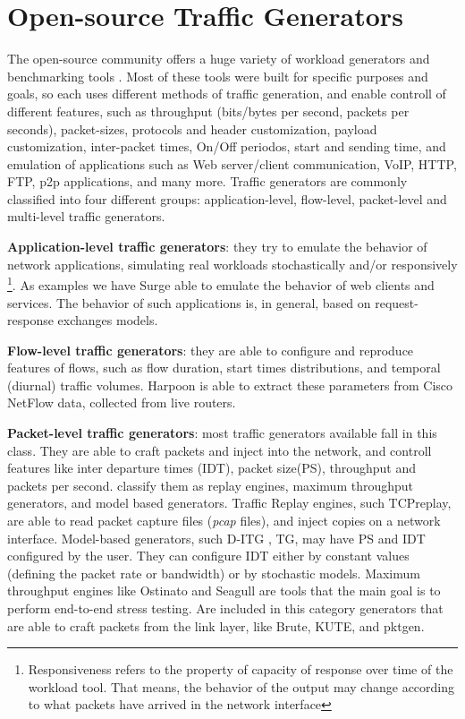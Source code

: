 \section{Open-source Traffic Generators}\label{sec:review}


The open-source community offers a huge variety of workload generators and benchmarking tools \cite{ditg-paper}\cite{validate-trafficgen}\cite{comparative-trafficgen-tools}\cite{performance-trafficgen}. Most of these tools were built for specific purposes and goals, so each uses different methods of traffic generation, and enable controll of different features, such as throughput (bits/bytes per second, packets per seconds), packet-sizes, protocols and header customization, payload customization, inter-packet times, On/Off periodos, start and sending time, and emulation of applications such as Web server/client communication, VoIP, HTTP, FTP, p2p applications, and many more. Traffic generators are commonly classified into four different groups\cite{do-you-trust}: application-level, flow-level, packet-level and multi-level traffic generators. 

\textbf{Application-level traffic generators}: they try to emulate the behavior of network applications, simulating real workloads stochastically and/or responsively \footnote{Responsiveness refers to the property of capacity of response over time of the workload tool. That means, the behavior of the output may change according to what packets have arrived in the network interface}. As examples we have Surge\cite{surge-paper} able to emulate the behavior of web clients and services. The behavior of such applications is, in general, based on request-response exchanges models.

\textbf{Flow-level traffic generators}: they are able to configure and reproduce features of flows\cite{do-you-trust}\cite{sourcesonoff-paper}, such as flow duration, start times distributions, and temporal (diurnal) traffic volumes\cite{do-you-trust}. Harpoon \cite{harpoon-paper} is able to extract these parameters from Cisco NetFlow data, collected from live routers.

\textbf{Packet-level traffic generators}: most traffic generators available fall in this class. They are able to craft packets and inject into the network, and controll features like inter departure times (IDT), packet size(PS), throughput and packets per second\cite{validate-trafficgen}. \cite{validate-trafficgen} classify them as replay engines, maximum throughput generators, and model based generators. Traffic Replay engines, such TCPreplay\cite{web-tcpreplay}, are  able to read packet capture files (\textit{pcap} files), and inject copies on a network interface. Model-based generators, such D-ITG \cite{ditg-paper}, TG\cite{web-tg}, may have PS and IDT configured by the user. They can configure IDT  either by constant values (defining the packet rate or bandwidth) or by stochastic models. Maximum throughput engines like Ostinato and Seagull are tools that the main goal is to perform end-to-end stress testing. Are included in this category generators that are able to craft packets from the link layer, like Brute, KUTE, and pktgen.

